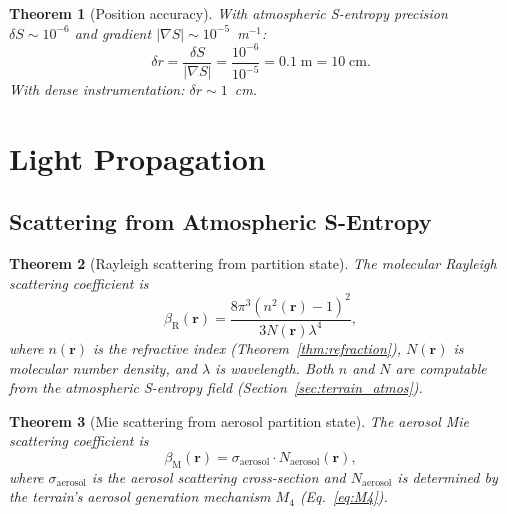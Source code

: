 \documentclass[10pt,twocolumn]{article}
\newtheorem{theorem}{Theorem}[section]
\theoremstyle{definition}
\theoremstyle{remark}
\begin{document}
\begin{theorem}[Position accuracy]\label{thm:accuracy}
With atmospheric S-entropy precision
$\delta S\sim 10^{-6}$ and gradient
$|\nabla S|\sim 10^{-5}$~m$^{-1}$:
\begin{equation}\label{eq:pos_accuracy}
  \delta r = \frac{\delta S}{|\nabla S|}
  = \frac{10^{-6}}{10^{-5}}
  = 0.1\;\mathrm{m} = 10\;\mathrm{cm}.
\end{equation}
With dense instrumentation:
$\delta r\sim 1$~cm.
\end{theorem}

\section{Light Propagation}\label{sec:light}

\subsection{Scattering from Atmospheric S-Entropy}
\label{sec:scattering}

\begin{theorem}[Rayleigh scattering from partition state]
\label{thm:rayleigh}
The molecular Rayleigh scattering coefficient is
\begin{equation}\label{eq:rayleigh}
  \beta_{\mathrm{R}}(\mathbf{r})
  = \frac{8\pi^3(n^2(\mathbf{r})-1)^2}
    {3N(\mathbf{r})\lambda^4},
\end{equation}
where $n(\mathbf{r})$ is the refractive index
(Theorem~\ref{thm:refraction}), $N(\mathbf{r})$ is molecular
number density, and $\lambda$ is wavelength.  Both $n$ and $N$
are computable from the atmospheric S-entropy field
(Section~\ref{sec:terrain_atmos}).
\end{theorem}

\begin{theorem}[Mie scattering from aerosol partition state]
\label{thm:mie}
The aerosol Mie scattering coefficient is
\begin{equation}\label{eq:mie}
  \beta_{\mathrm{M}}(\mathbf{r})
  = \sigma_{\mathrm{aerosol}}\cdot
    N_{\mathrm{aerosol}}(\mathbf{r}),
\end{equation}
where $\sigma_{\mathrm{aerosol}}$ is the aerosol scattering
cross-section and $N_{\mathrm{aerosol}}$ is determined by the
terrain's aerosol generation mechanism $M_4$
(Eq.~\eqref{eq:M4}).
\end{theorem}
\end{document}
